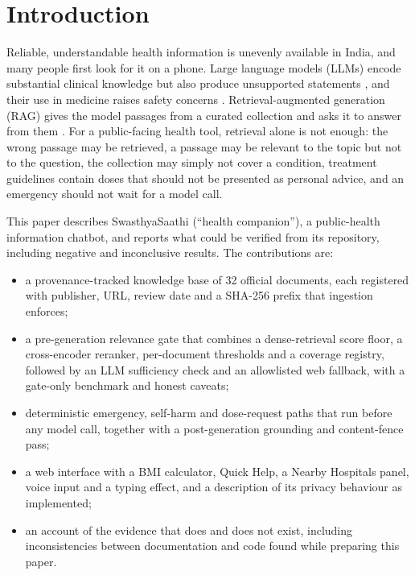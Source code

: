 \documentclass[10pt,a4paper]{article}
\begin{document}
\section{Introduction}
Reliable, understandable health information is unevenly available in India, and many people first look for it on a phone. Large language models (LLMs) encode substantial clinical knowledge \citep{singhal2023} but also produce unsupported statements \citep{ji2023}, and their use in medicine raises safety concerns \citep{thirunavukarasu2023}. Retrieval-augmented generation (RAG) gives the model passages from a curated collection and asks it to answer from them \citep{lewis2020}. For a public-facing health tool, retrieval alone is not enough: the wrong passage may be retrieved, a passage may be relevant to the topic but not to the question, the collection may simply not cover a condition, treatment guidelines contain doses that should not be presented as personal advice, and an emergency should not wait for a model call.

This paper describes SwasthyaSaathi (``health companion''), a public-health information chatbot, and reports what could be verified from its repository, including negative and inconclusive results. The contributions are:
\begin{itemize}
  \item a provenance-tracked knowledge base of 32 official documents, each registered with publisher, URL, review date and a SHA-256 prefix that ingestion enforces;
  \item a pre-generation relevance gate that combines a dense-retrieval score floor, a cross-encoder reranker, per-document thresholds and a coverage registry, followed by an LLM sufficiency check and an allowlisted web fallback, with a gate-only benchmark and honest caveats;
  \item deterministic emergency, self-harm and dose-request paths that run before any model call, together with a post-generation grounding and content-fence pass;
  \item a web interface with a BMI calculator, Quick Help, a Nearby Hospitals panel, voice input and a typing effect, and a description of its privacy behaviour as implemented;
  \item an account of the evidence that does and does not exist, including inconsistencies between documentation and code found while preparing this paper.
\end{itemize}

\end{document}
